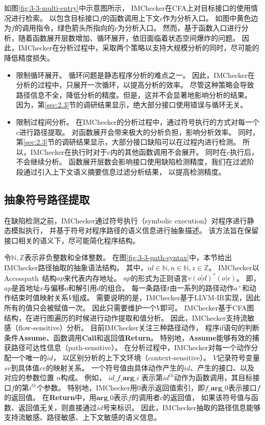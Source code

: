 如图\ref{fig:3-3-multi-entry}中示意图所示，
IMChecker在CFA上对目标接口的使用情况进行检索。
以包含目标接口$f$的函数调用上下文$c$作为分析入口。
如图中黄色边为$f$的调用指令，绿色箭头所指向的$c$为分析入口。
然而，基于函数入口进行分析，随着函数展开层数增加、循环展开，依旧面临着状态空间爆炸的问题。
因此，IMChecker在分析过程中，采取两个策略以支持大规模分析的同时，尽可能的降低精度损失。
\begin{itemize}
	\item 限制循环展开。
	循环问题是静态程序分析的难点之一。
	因此，IMChecker在分析的过程中，只展开一次循环，以提高分析的效率。
	尽管这种策略会导致路径信息不全，降低分析的精度。但是，这并不会显著地影响分析的结果。
	因为，第\ref{sec:2.3}节的调研结果显示，绝大部分接口使用错误与循环无关。
	\item 限制过程间分析。
	在IMChecker的分析过程中，通过符号执行的方式对每一个$c$进行路径提取。
	对函数展开会带来极大的分析负担，影响分析效率。
	同时，第\ref{sec:2.3}节的调研结果显示，大部分接口缺陷可以在过程内进行检测。
	所以，IMChecker在执行时对于$c$内的其他函数调用不会展开。
	同时在$c$执行后，不会继续分析。
	函数展开层数会影响接口使用缺陷检测精度，我们在过滤阶段通过引入上下文语义摘要信息过滤分析结果，
	以提高检测精度。
\end{itemize}


\subsection{抽象符号路径提取}
在缺陷检测之前，IMChecker通过符号执行（symbolic execution）对程序进行静态模拟执行，
并基于符号对程序路径的语义信息进行抽象描述。
该方法旨在保留接口相关的语义下，尽可能简化程序结构。



令$\mathbb{N, Z}$表示非负整数和全体整数。
在图\ref{fig:3-3-path-syntax}中，本节给出IMChecker路径抽取的抽象语法结构。
其中，$id \in \mathbb{N}, n \in \mathbb{N}, z \in \mathbb{Z}$。
IMChecker以Accesspath~\cite{15-ase-accesspath}结构$ap$来代表内存地址。
$ap$的形式为正则语言$v(o|d)^*(o|\epsilon)$。
即，$ap$是首地址$v$与偏移$o$和解引用$d$的组合。
每一条路径$\mathit{t}$由一系列的路径动作$\mathit{a}^+$和动作结束时值映射关系$\mathit{V}$组成。
需要说明的是，IMChecker基于LLVM-IR实现，因此所有的值只会被赋值一次。
因此只需要维护一个$\mathit{V}$即可。
IMChecker基于CFA图结构，在进行图遍历的时候进行动作提取和值分析。
因此，IMChecker支持流敏感（flow-sensitive）分析。
目前IMChecker关注三种路径动作，
程序if语句的判断条件\textbf{Assume}、函数调用\textbf{Call}和返回值\textbf{Return}。
特别地，\textbf{Assume}能够有效的捕获路径可达性信息（path-sensitive）。
在分析过程中，IMChecker对每一个动作分配一个唯一的$id$，
以区别分析的上下文环境（context-sensitive）。
$\mathit{V}$记录符号变量$\mathit{sv}$到具体值$\mathit{cv}$的映射关系。
一个符号值由具体动作产生的$id$、产生的接口、以及对应的参数位置 $\mathit{n}$构成。
例如， $\mathit{id}\_f\_\textbf{arg}\_\mathit{i}$
表示第$id^{th}$动作为函数调用，其目标接口$f$的第$\mathit{i}^{th}$个参数。
特别地，IMChecker用0表示返回值索引，即$f\_\textbf{arg}\_0$表示接口$f$的返回值。
在\textbf{Return}中，用$\textbf{arg}\_0$表示$f$的调用者$c$的返回值，
如果该符号值与函数、返回值无关，则直接通过$id$号来标识。
因此，IMChecker抽取的路径信息能够支持流敏感、路径敏感、上下文敏感的语义信息。


